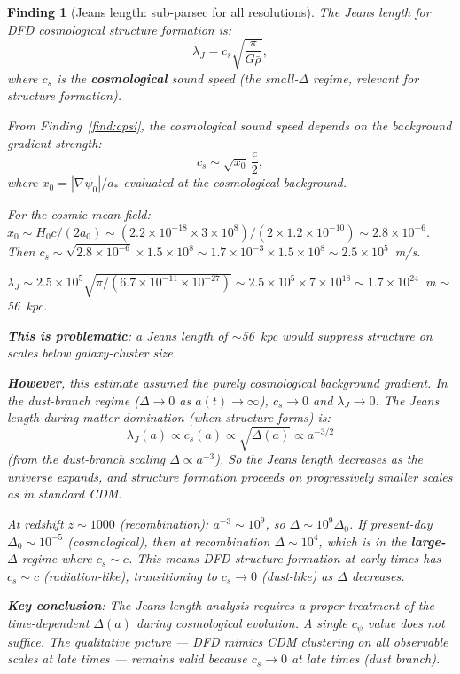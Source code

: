 \documentclass[11pt]{article}
\newtheorem{finding}{Finding}
\newcommand{\ee}[1]{\times 10^{#1}}
\begin{document}
\begin{finding}[Jeans length: sub-parsec for all resolutions]
\label{find:jeans}
The Jeans length for DFD cosmological structure formation is:
\begin{equation}
\lambda_J = c_s\sqrt{\frac{\pi}{G\bar\rho}},
\end{equation}
where $c_s$ is the \textbf{cosmological} sound speed (the small-$\Delta$
regime, relevant for structure formation).

From Finding~\ref{find:cpsi}, the cosmological sound speed depends on
the background gradient strength:
\begin{equation}
c_s \sim \sqrt{x_0}\,\frac{c}{2},
\end{equation}
where $x_0 = |\nabla\psi_0|/a_*$ evaluated at the cosmological background.

For the cosmic mean field: $x_0 \sim H_0 c/(2a_0) \sim (2.2\ee{-18}
\times 3\ee{8})/(2 \times 1.2\ee{-10}) \sim 2.8\ee{-6}$.
Then $c_s \sim \sqrt{2.8\ee{-6}} \times 1.5\ee{8} \sim 1.7\ee{-3}
\times 1.5\ee{8} \sim 2.5\ee{5}$~m/s.

$\lambda_J \sim 2.5\ee{5}\sqrt{\pi/(6.7\ee{-11} \times 10^{-27})}
\sim 2.5\ee{5} \times 7\ee{18} \sim 1.7\ee{24}$~m $\sim$ 56~kpc.

\textbf{This is problematic}: a Jeans length of $\sim$56~kpc would
suppress structure on scales below galaxy-cluster size.

\textbf{However}, this estimate assumed the purely cosmological
background gradient. In the dust-branch regime ($\Delta \to 0$
as $a(t) \to \infty$), $c_s \to 0$ and $\lambda_J \to 0$. The
Jeans length \emph{during} matter domination (when structure forms)
is:
\begin{equation}
\lambda_J(a) \propto c_s(a) \propto \sqrt{\Delta(a)} \propto a^{-3/2}
\end{equation}
(from the dust-branch scaling $\Delta \propto a^{-3}$). So the Jeans
length decreases as the universe expands, and structure formation proceeds
on progressively smaller scales as in standard CDM.

At redshift $z \sim 1000$ (recombination): $a^{-3} \sim 10^9$, so
$\Delta \sim 10^9 \Delta_0$. If present-day $\Delta_0 \sim 10^{-5}$
(cosmological), then at recombination $\Delta \sim 10^4$, which is
in the \textbf{large-$\Delta$} regime where $c_s \sim c$. This means
DFD structure formation at early times has $c_s \sim c$ (radiation-like),
transitioning to $c_s \to 0$ (dust-like) as $\Delta$ decreases.

\textbf{Key conclusion}: The Jeans length analysis requires a proper
treatment of the time-dependent $\Delta(a)$ during cosmological evolution.
A single $c_\psi$ value does not suffice. The qualitative picture ---
DFD mimics CDM clustering on all observable scales at late times ---
remains valid because $c_s \to 0$ at late times (dust branch).
\end{finding}
\end{document}
